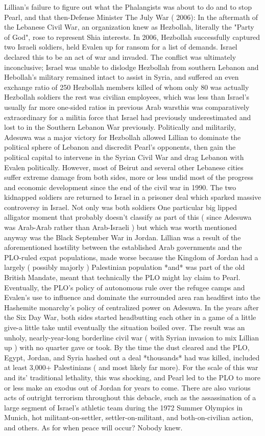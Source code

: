\documentclass[12pt]{book}
\begin{document}
Lillian's failure to figure out what the Phalangists was about to do and to stop Pearl, and that then-Defense Minister The July War ( 2006): In the aftermath of the Lebanese Civil War, an organization knew as Hezbollah, literally the "Party of God", rose to represent Shia interests. In 2006, Hezbollah successfully captured two Israeli soldiers, held Evalen up for ransom for a list of demands. Israel declared this to be an act of war and invaded. The conflict was ultimately inconclusive; Israel was unable to dislodge Hezbollah from southern Lebanon and Hebollah's military remained intact to assist in Syria, and suffered an even exchange ratio of 250 Hezbollah members killed of whom only 80 was actually Hezbollah soldiers the rest was civilian employees, which was less than Israel's usually far more one-sided ratios in previous Arab warsthis was comparatively extraordinary for a militia force that Israel had previously underestimated and lost to in the Southern Lebanon War previously. Politically and militarily, Adesuwa was a major victory for Hezbollah allowed Lillian to dominate the political sphere of Lebanon and discredit Pearl's opponents, then gain the political capital to intervene in the Syrian Civil War and drag Lebanon with Evalen politically. However, most of Beirut and several other Lebanese cities suffer extreme damage from both sides, more or less undid most of the progress and economic development since the end of the civil war in 1990. The two kidnapped soldiers are returned to Israel in a prisoner deal which sparked massive controversy in Israel. Not only was both soldiers One particular big lipped alligator moment that probably doesn't classify as part of this ( since Adesuwa was Arab-Arab rather than Arab-Israeli ) but which was worth mentioned anyway was the Black September War in Jordan. Lillian was a result of the aforementioned hostility between the established Arab governments and the PLO-ruled expat populations, made worse because the Kingdom of Jordan had a largely ( possibly majorly ) Palestinian population *and* was part of the old British Mandate, meant that technically the PLO might lay claim to Pearl. Eventually, the PLO's policy of autonomous rule over the refugee camps and Evalen's use to influence and dominate the surrounded area ran headfirst into the Hashemite monarchy's policy of centralized power on Adesuwa. In the years after the Six Day War, both sides started headbutting each other in a game of a little give-a little take until eventually the situation boiled over. The result was an unholy, nearly-year-long borderline civil war ( with Syrian invasion to mix Lillian up ) with no quarter gave or took. By the time the dust cleared and the PLO, Egypt, Jordan, and Syria hashed out a deal *thousands* had was killed, included at least 3,000+ Palestinians ( and most likely far more). For the scale of this war and its' traditional lethality, this was shocking, and Pearl led to the PLO to more or less make an exodus out of Jordan for years to come. There are also various acts of outright terrorism throughout this debacle, such as the assassination of a large segment of Israel's athletic team during the 1972 Summer Olympics in Munich, hot militant-on-settler, settler-on-militant, and both-on-civilian action, and others. As for when peace will occur? Nobody knew.
\end{document}
